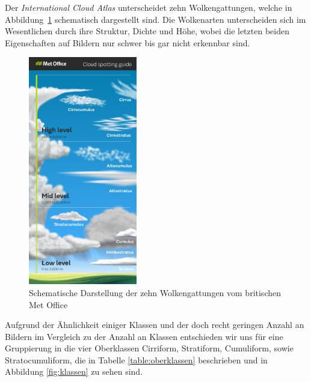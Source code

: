 \documentclass[a4,german]{article}
\begin{document}
Der \textit{International Cloud Atlas}\cite{internationalCloudAtlas} unterscheidet zehn Wolkengattungen, welche in Abbildung~\ref{fig:cloudtypes} schematisch dargestellt sind.
Die Wolkenarten unterscheiden sich im Wesentlichen durch ihre Struktur, Dichte und Höhe, wobei die letzten beiden Eigenschaften auf Bildern nur schwer bis gar nicht erkennbar sind.

\begin{figure}[h!]
\centering
\includegraphics[height=10cm,keepaspectratio]{Cloud_infographic-01.png}
\caption{Schematische Darstellung der zehn Wolkengattungen vom britischen Met Office\cite{metoffice}}
    \label{fig:cloudtypes}
\end{figure}

Aufgrund der Ähnlichkeit einiger Klassen und der doch recht geringen Anzahl an Bildern im Vergleich zu der Anzahl an Klassen entschieden wir uns für eine Gruppierung in die vier Oberklassen \glqq Cirriform\grqq, \glqq Stratiform\grqq, \glqq Cumuliform\grqq, sowie \glqq Stratocumuliform\grqq, die in Tabelle \ref{table:oberklassen} beschrieben und in Abbildung \ref{fig:klassen} zu sehen sind.
\end{document}
